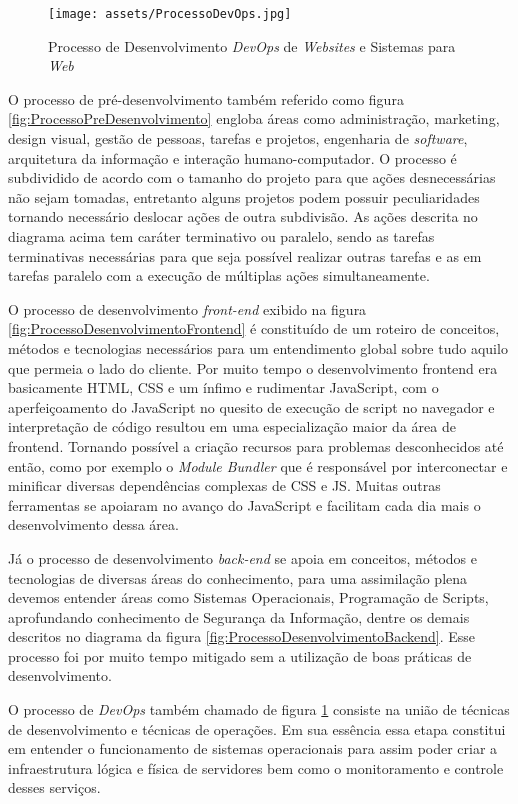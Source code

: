 \begin{figure}[htbp]
  \begin{center}
  \texttt{[image: assets/ProcessoDevOps.jpg]}\\
  \end{center}
  \caption[Processo de Desenvolvimento DevOps de Websites e Sistemas para Web]{Processo de Desenvolvimento \textit{DevOps} de \textit{Websites} e Sistemas para \textit{Web}}
  \label{fig:ProcessoDevOpsDesenvolvimento}
\end{figure}
O processo de pré-desenvolvimento também referido como figura \ref{fig:ProcessoPreDesenvolvimento} engloba áreas como administração, marketing, design visual, gestão de pessoas, tarefas e projetos, engenharia de \textit{software}, arquitetura da informação e interação humano-computador. O processo é subdividido de acordo com o tamanho do projeto para que ações desnecessárias não sejam tomadas, entretanto alguns projetos podem possuir peculiaridades tornando necessário deslocar ações de outra subdivisão. As ações descrita no diagrama acima tem caráter terminativo ou paralelo, sendo as tarefas terminativas necessárias para que seja possível realizar outras tarefas e as em tarefas paralelo com a execução de múltiplas ações simultaneamente.

O processo de desenvolvimento \textit{front-end} exibido na figura \ref{fig:ProcessoDesenvolvimentoFrontend} é constituído de um roteiro de conceitos, métodos e tecnologias necessários para um entendimento global sobre tudo aquilo que permeia o lado do cliente. Por muito tempo o desenvolvimento frontend era basicamente HTML, CSS e um ínfimo e rudimentar JavaScript, com o aperfeiçoamento do JavaScript no quesito de execução de script no navegador e interpretação de código resultou em uma especialização maior da área de frontend. Tornando possível a criação recursos para problemas desconhecidos até então, como por exemplo o \textit{Module Bundler} que é responsável por interconectar e minificar diversas dependências complexas de CSS e JS. Muitas outras ferramentas se apoiaram no avanço do JavaScript e facilitam cada dia mais o desenvolvimento dessa área.

Já o processo de desenvolvimento \textit{back-end} se apoia em conceitos, métodos e tecnologias de diversas áreas do conhecimento, para uma assimilação plena devemos entender áreas como Sistemas Operacionais, Programação de Scripts, aprofundando conhecimento de Segurança da Informação, dentre os demais descritos no diagrama da figura \ref{fig:ProcessoDesenvolvimentoBackend}. Esse processo foi por muito tempo mitigado sem a utilização de boas práticas de desenvolvimento.

O processo de \textit{DevOps} também chamado de figura \ref{fig:ProcessoDevOpsDesenvolvimento} consiste na união de técnicas de desenvolvimento e técnicas de operações. Em sua essência essa etapa constitui em entender o funcionamento de sistemas operacionais para assim poder criar a infraestrutura lógica e física de servidores bem como o monitoramento e controle desses serviços.